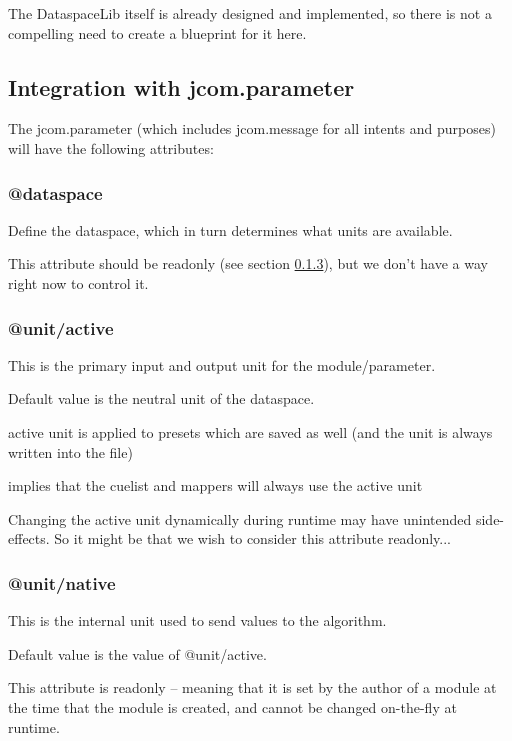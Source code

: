 \documentclass[]{article}
\begin{document}
The DataspaceLib itself is already designed and implemented, so there is not a compelling need to create a blueprint for it here.



\subsection{Integration with jcom.parameter}

The jcom.parameter (which includes jcom.message for all intents and purposes) will have the following attributes:


\subsubsection{@dataspace}

Define the dataspace, which in turn determines what units are available.

This attribute should be readonly (see section \ref{sec:unit/native}), but we don't have a way right now to control it. 


\subsubsection{@unit/active}

This is the primary input and output unit for the module/parameter.

Default value is the neutral unit of the dataspace.

active unit is applied to presets which are saved as well 
  (and the unit is always written into the file)

implies that the cuelist and mappers will always use the active unit

Changing the active unit dynamically during runtime may have unintended side-effects.  So it might be that we wish to consider this attribute readonly...


\subsubsection{@unit/native}    \label{sec:unit/native}

This is the internal unit used to send values to the algorithm.

Default value is the value of @unit/active.

This attribute is readonly -- meaning that it is set by the author of a module at the time that the module is created, and cannot be changed on-the-fly at runtime.
\end{document}
